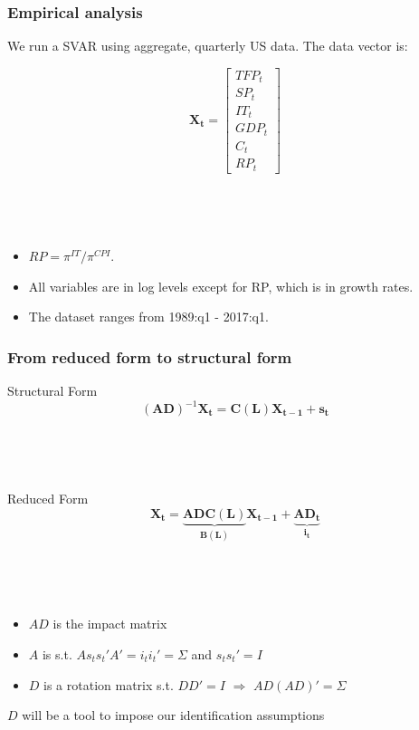 \documentclass{beamer}
\begin{document}
\begin{frame}
	\frametitle{Empirical analysis}

	We run a SVAR using aggregate, quarterly US data. The data vector is:
	
	\begin{equation}
	\mathbf{X_t} = 
	\begin{bmatrix}
    TFP_t      \\
 
   SP_t   \\
   
   IT_t \\
   
   GDP_t \\
   
   C_t \\
   
   RP_t
\end{bmatrix}
	\end{equation}
	


\

\

\begin{itemize}
\item $RP = \pi^{IT}/\pi^{CPI}$. 
\item All variables are in log levels except for RP, which is in growth rates. 
\item The dataset ranges from 1989:q1 - 2017:q1.
\end{itemize}	
	
\end{frame}

\begin{frame}
	\frametitle{From reduced form to structural form}
	\label{identification}
	
Structural Form	
\begin{equation}
(\mathbf{AD})^{-1}
    \mathbf{X_{t}}
= \mathbf{C(L)} 
\mathbf{X_{t-1}}
+ \mathbf{s_t}
\end{equation}

\

\

Reduced Form
\begin{equation}
\mathbf{X_{t}}
= \underbrace{\mathbf{AD} \mathbf{C(L)}}_\text{$\mathbf{B(L)}$} 
\mathbf{X_{t-1}}
+ \underbrace{\mathbf{AD} \mathbf{_t}}_\text{$\mathbf{i_t}$}
\end{equation}

\

\

\begin{itemize}
	\item $AD$ is the impact matrix
	\item $A$ is s.t. $As_t s_t' A' = i_t i_t' = \Sigma$ and $s_t s_t' = I$
	\item $D$ is a rotation matrix s.t. $DD' = I$ $\Rightarrow$ $AD(AD)' = \Sigma$
\end{itemize}

$D$ will be a tool to impose our identification assumptions \hyperlink{Technicalities}{}

\end{frame}
\end{document}
